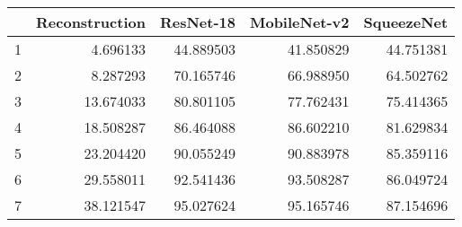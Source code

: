 \begin{tabular}{lrrrr}
\toprule
{} &  Reconstruction &  ResNet-18 &  MobileNet-v2 &  SqueezeNet \\
\midrule
1 &        4.696133 &  44.889503 &     41.850829 &   44.751381 \\
2 &        8.287293 &  70.165746 &     66.988950 &   64.502762 \\
3 &       13.674033 &  80.801105 &     77.762431 &   75.414365 \\
4 &       18.508287 &  86.464088 &     86.602210 &   81.629834 \\
5 &       23.204420 &  90.055249 &     90.883978 &   85.359116 \\
6 &       29.558011 &  92.541436 &     93.508287 &   86.049724 \\
7 &       38.121547 &  95.027624 &     95.165746 &   87.154696 \\
\bottomrule
\end{tabular}
